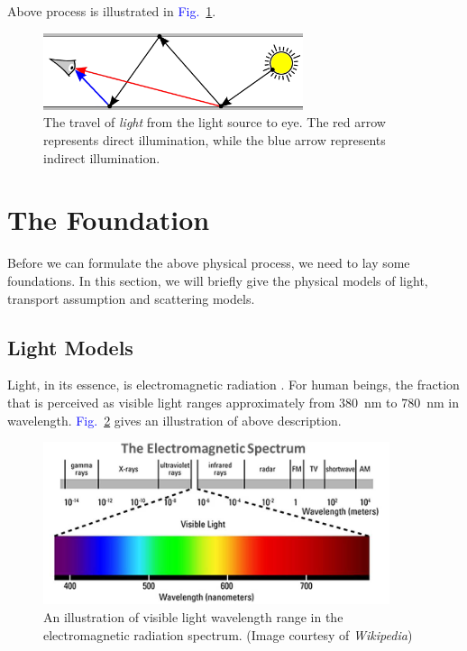 \documentclass[]{book}
\renewcommand{\figurename}{\textcolor{blue}{Fig.\ }}
\begin{document}
Above process is illustrated in \figurename \ref{fig:GI:MrLight}.

\begin{figure}
	\centering
	\includegraphics[width=3.0in]{img/GI-MrLight.png}
	\caption[Travel of \textit{light}]{The travel of \textit{light} from the light source to eye. The red arrow represents direct illumination, while the blue arrow represents indirect illumination.}
	\label{fig:GI:MrLight}
\end{figure}

\section{The Foundation}
\label{sec:GI:foundation}
Before we can formulate the above physical process, we need to lay some foundations.
In this section, we will briefly give the physical models of light, transport assumption and scattering models.

\subsection{Light Models}
\label{sec:GI:foundation:light}
Light, in its essence, is electromagnetic radiation \cite{PBRT3e}.
For human beings, the fraction that is perceived as visible light ranges approximately from \SI{380}{\nano \meter} to \SI{780}{\nano \meter} in wavelength.
\figurename \ref{fig:GI:SPD} gives an illustration of above description.

\begin{figure}[b]
	\centering
	\includegraphics[width=4.0in]{img/GI-SPD.png}
	\caption[Visible Light Spectrum]{An illustration of visible light wavelength range in the electromagnetic radiation spectrum. (Image courtesy of \textit{Wikipedia})}
	\label{fig:GI:SPD}
\end{figure}
\end{document}
